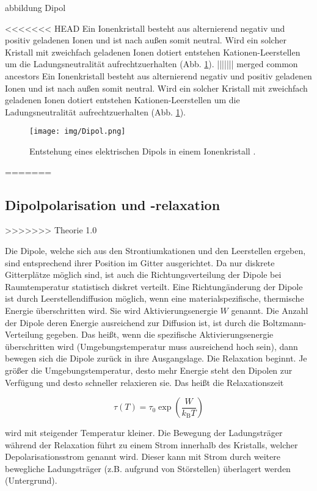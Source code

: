 abbildung Dipol

<<<<<<< HEAD
Ein Ionenkristall besteht aus alternierend negativ und positiv geladenen Ionen und ist nach außen somit neutral.
Wird ein solcher Kristall mit zweichfach geladenen Ionen dotiert entstehen Kationen-Leerstellen um die Ladungsneutralität aufrechtzuerhalten (Abb. \ref{fig:dipol}). 
||||||| merged common ancestors
Ein Ionenkristall besteht aus alternierend negativ und positiv geladenen Ionen und ist nach außen somit neutral.
Wird ein solcher Kristall mit zweichfach geladenen Ionen dotiert entstehen Kationen-Leerstellen um die Ladungsneutralität aufrechtzuerhalten (Abb. \ref{fig:dipol}). 
\begin{figure}
    \centering
    \texttt{[image: img/Dipol.png]}
    \caption{Entstehung eines elektrischen Dipols in einem Ionenkristall \cite{V48}.}
    \label{fig:dipol}
\end{figure}
=======
\subsection{Dipolpolarisation und -relaxation}
\label{sec:Dipolpolarisation}
>>>>>>> Theorie 1.0

Die Dipole, welche sich aus den Strontiumkationen und den Leerstellen ergeben, 
sind entsprechend ihrer Position im Gitter ausgerichtet. Da nur diskrete 
Gitterplätze möglich sind, ist auch die Richtungsverteilung der Dipole bei 
Raumtemperatur statistisch diskret verteilt. Eine Richtungänderung der 
Dipole ist durch Leerstellendiffusion möglich, wenn eine materialspezifische, 
thermische Energie überschritten wird. Sie wird Aktivierungsenergie $W$ genannt. 
Die Anzahl der Dipole deren Energie ausreichend zur Diffusion ist, ist durch die 
Boltzmann-Verteilung gegeben. Das heißt, wenn die spezifische Aktivierungsenergie 
überschritten wird  (Umgebungstemperatur muss ausreichend hoch sein), dann bewegen sich 
die Dipole zurück in ihre Ausgangslage. Die Relaxation beginnt. 
Je größer die Umgebungstemperatur, desto mehr Energie steht den Dipolen zur Verfügung 
und desto schneller relaxieren sie. Das heißt die Relaxationszeit 

\begin{equation}
    \tau(T) = \tau_0 \exp{\left(\frac{W}{k_\text{B}T}\right)}
    \label{eq1}
\end{equation}

wird mit steigender Temperatur kleiner. Die Bewegung der Ladungsträger während der 
Relaxation führt zu einem Strom innerhalb des Kristalls, welcher 
Depolarisationsstrom genannt wird. Dieser kann mit Strom durch
weitere bewegliche Ladungsträger (z.B. aufgrund von Störstellen) überlagert werden
(Untergrund).


